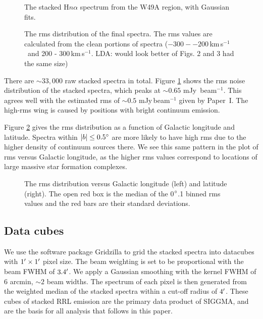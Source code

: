 \documentclass[manuscript]{aastex61}
\newcommand{\kms}{\,km\,s$^{-1}$}
\begin{document}
\begin{figure}%
\begin{minipage}{.48\textwidth}
\centering
{}
\caption{The stacked H$n\alpha$ spectrum from the W49A region, with Gaussian fits.}\label{fig_spec}
\end{minipage}
\hfill
\begin{minipage}{.48\textwidth}
\centering
{}
\caption{The rms distribution of the final spectra.
The rms values are calculated from the clean portions of spectra ($-300 - -200$\kms\ and 200 - 300\kms.  LDA: would look better of Figs. 2 and 3 had the same size)
}\label{fig_rms}
\end{minipage}
\end{figure}

There are $\sim33,000$ raw stacked spectra in total.
Figure \ref{fig_rms} shows the rms noise distribution of the stacked spectra, which peaks at $\sim0.65$ mJy\, beam$^{-1}$. 
This agrees well with the estimated rms of $\sim 0.5$ mJy\,beam$^{-1}$ given by Paper~I. 
The high-rms wing is caused by positions with bright continuum emission.

Figure \ref{fig_rms_glat} gives the rms distribution as a function of Galactic longitude and latitude.
Spectra within $|b| \leq 0.5\mbox{$^\circ$}$ are more likely to have high rms due to the higher density of continuum sources there.
We see this same pattern in the plot of rms versus Galactic longitude, as the higher rms values correspond to locations of large massive star formation complexes.

\begin{figure}[htbp]
\caption{The rms distribution versus Galactic longitude (left) and latitude (right).
The open red box is the median of the 0$\mbox{$^\circ$}$.1 binned rms values and the red bars are their standard deviations.
}\label{fig_rms_glat}
\end{figure}


\subsection{Data cubes} \label{sec_cube}
We use the software package Gridzilla \citep{Barnes2001} to grid the stacked spectra into datacubes with $1\mbox{$^\prime$} \times 1\mbox{$^\prime$}$ pixel size.
The beam weighting is set to be proportional with the beam FWHM of $3.4\mbox{$^\prime$}$.
We apply a Gaussian smoothing with the kernel FWHM of 6 arcmin, $\sim 2$ beam widths.
The spectrum of each pixel is then generated from the weighted median of the stacked spectra within a cut-off radius of $4\mbox{$^\prime$}$.
These cubes of stacked RRL emission are the primary data product of SIGGMA, and are the basis for all analysis that follows in this paper.
\end{document}
